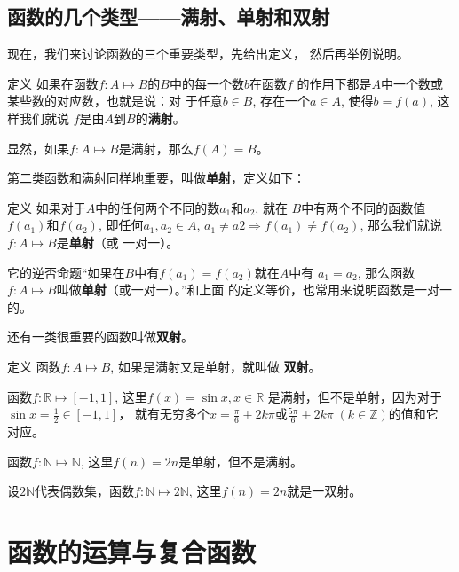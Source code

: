 \subsection{函数的几个类型——满射、单射和双射}
现在，我们来讨论函数的三个重要类型，先给出定义，
然后再举例说明。

\begin{blk}{定义 }
   如果在函数$f:A\mapsto B$的$B$中的每一个数$b$在函数$f$
的作用下都是$A$中一个数或某些数的对应数，也就是说：对
于任意$b\in B$, 存在一个$a\in A$, 使得$b=f(a)$, 这样我们就说
$f$是由$A$到$B$的\textbf{满射}。
\end{blk}

显然，如果$f:A\mapsto B$是满射，那么$f(A)=B$。

第二类函数和满射同样地重要，叫做\textbf{单射}，定义如下：

\begin{blk}{定义}
    如果对于$A$中的任何两个不同的数$a_1$和$a_2$, 就在
$B$中有两个不同的函数值$f(a_1)$和$f(a_2)$, 即任何$a_1,a_2\in A$,
$a_1\ne a2\Rightarrow f(a_1)\ne f(a_2)$, 那么我们就说$f:A\mapsto B$是\textbf{单射}（或
一对一）。
\end{blk}

 
它的逆否命题“如果在$B$中有$f(a_1)=f(a_2)$就在$A$中有
$a_1=a_2$, 那么函数$f:A\mapsto B$叫做\textbf{单射}（或一对一）。”和上面
的定义等价，也常用来说明函数是一对一的。

还有一类很重要的函数叫做\textbf{双射}。

\begin{blk}{定义}
    函数$f:A\mapsto B$, 如果是满射又是单射，就叫做
    \textbf{双射}。
\end{blk}

\begin{example}
    函数$f:\mathbb{R}\mapsto [-1,1]$, 这里$f(x)=\sin x, x\in\mathbb{R}$
是满射，但不是单射，因为对于
$\sin x=\frac{1}{2}\in [-1,1]$，
就有无穷多个$x=\frac{\pi}{6}+2k\pi$或$\frac{5\pi}{6}+2k\pi\;(k\in\mathbb{Z})$的值和它
对应。
\end{example}

\begin{example}
    函数$f:\mathbb{N}\mapsto\mathbb{N}$, 这里$f(n)=2n$是单射，但不是满射。
\end{example}

\begin{example}
    设$2\mathbb{N}$代表偶数集，函数$f:\mathbb{N}\mapsto 2 \mathbb{N}$, 这里$f(n)=2n$就是一双射。
\end{example}

\section{函数的运算与复合函数}

